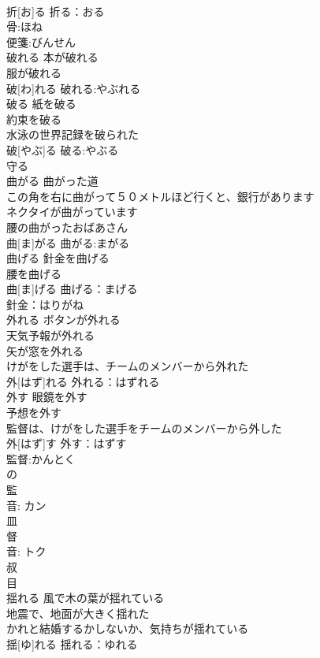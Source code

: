 \documentclass[8pt]{extreport}
\begin{document}
\begin{CJK}{UTF8}{min}
\\	折[お]る			折る：おる
\\	骨:ほね
\\	便箋:びんせん
\\	破れる	本が破れる 
\\	服が破れる 
\\	破[わ]れる			破れる:やぶれる
\\	破る	紙を破る 
\\	約束を破る 
\\	水泳の世界記録を破られた 
\\	破[やぶ]る			破る:やぶる
\\	守る 
\\	曲がる	曲がった道 
\\	この角を右に曲がって５０メトルほど行くと、銀行があります 
\\	ネクタイが曲がっています 
\\	腰の曲がったおばあさん 
\\	曲[ま]がる			曲がる:まがる
\\	曲げる	針金を曲げる 
\\	腰を曲げる 
\\	曲[ま]げる			曲げる：まげる
\\	針金：はりがね
\\	外れる	ボタンが外れる 
\\	天気予報が外れる 
\\	矢が窓を外れる 
\\	けがをした選手は、チームのメンバーから外れた 
\\	外[はず]れる			外れる：はずれる
\\	外す	眼鏡を外す 
\\	予想を外す 
\\	監督は、けがをした選手をチームのメンバーから外した 
\\	外[はず]す			外す：はずす
\\	監督:かんとく
\\	の 
\\	監 
\\	音: カン 
\\	皿 
\\	督 
\\	音: トク 
\\	叔 
\\	目 
\\	揺れる	風で木の葉が揺れている 
\\	地震で、地面が大きく揺れた 
\\	かれと結婚するかしないか、気持ちが揺れている 
\\	揺[ゆ]れる			揺れる：ゆれる

\end{CJK}
\end{document}
